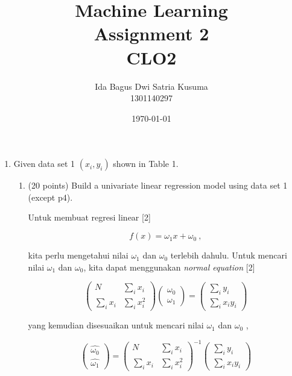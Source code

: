 \documentclass[12pt]{article}%
\begin{document}
\newcommand\scalemath[2]{\scalebox{#1}{\mbox{\ensuremath{\displaystyle #2}}}}
\title{Machine Learning \protect\\ Assignment 2 \protect\\ CLO2} 
\author{Ida Bagus Dwi Satria Kusuma \protect\\ 1301140297}
\date{\today}
\maketitle

\begin{enumerate}
	\item \par Given data set 1 $(x_i, y_i)$ shown in Table 1.
	
	\begin{enumerate}
		\item (20 points) Build a univariate linear regression model using data set 1 (except p4).
		\par Untuk membuat regresi linear [2]

		\[f(x) = \omega_1 x + \omega_0 \ ,\]

		\par kita perlu mengetahui nilai $\omega_1$ dan $\omega_0$ terlebih dahulu. Untuk mencari nilai $\omega_1$ dan $\omega_0$, kita dapat menggunakan \textit{normal equation} [2]

			\[\begin{pmatrix} N & \sum_i x_i\\ \sum_i x_i & \sum_i x_i^2 \end{pmatrix} \begin{pmatrix} \omega_0 \\ \omega_1 \end{pmatrix} = \begin{pmatrix} \sum_i y_i\\ \sum_i x_i y_i \end{pmatrix}\]

		\par yang kemudian disesuaikan untuk mencari nilai $\omega_1$ dan $\omega_0$ ,

			\[\begin{pmatrix} \hat{\omega_0} \\ \hat{\omega_1} \end{pmatrix} = \begin{pmatrix} N & \sum_i x_i\\ \sum_i x_i & \sum_i x_i^2 \end{pmatrix}^{-1} \begin{pmatrix} \sum_i y_i\\ \sum_i x_i y_i \end{pmatrix}\]


\end{enumerate}
\end{enumerate}
\end{document}
